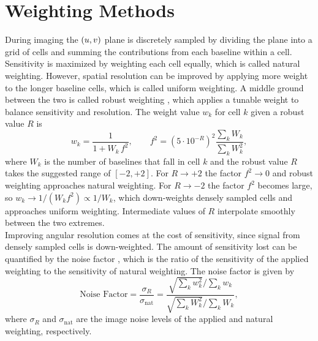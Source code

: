 \section{Weighting Methods}
During imaging the ${(u,v)}$ plane is discretely sampled by dividing the plane into a grid of cells and summing the contributions from each baseline within a cell. Sensitivity is maximized by weighting each cell equally, which is called natural weighting. However, spatial resolution can be improved by applying more weight to the longer baseline cells, which is called uniform weighting. A middle ground between the two is called robust weighting \cite{briggsHighFidelityDeconvolution1995}, which applies a tunable weight to balance sensitivity and resolution. The weight value $w_k$ for cell $k$ given a robust value $R$ is
\begin{equation}
    w_k = \frac{1}{1 + W_k\, f^2},
    \qquad
    f^2 = \left(5 \cdot 10^{-R}\right)^2 \frac{\sum_k W_k}{\sum_k W_k^2},
    \label{eq:briggs}
\end{equation}
where $W_k$ is the number of baselines that fall in cell $k$ and the robust value $R$ takes the suggested range of $[-2, +2]$. For $R \to +2$ the factor $f^2 \to 0$ and robust weighting approaches natural weighting. For $R \to -2$ the factor $f^2$ becomes large, so $w_k \to 1/(W_k f^2) \propto 1/W_k$, which down-weights densely sampled cells and approaches uniform weighting. Intermediate values of $R$ interpolate smoothly between the two extremes.\\

Improving angular resolution comes at the cost of sensitivity, since signal from densely sampled cells is down-weighted. The amount of sensitivity lost can be quantified by the noise factor \cite{briggsHighFidelityDeconvolution1995}, which is the ratio of the sensitivity of the applied weighting to the sensitivity of natural weighting. The noise factor is given by
\begin{equation}
    \text{Noise Factor} = \frac{\sigma_R}{\sigma_\text{nat}} = \frac{\sqrt{\sum_k w_k^2} \big/ \sum_k w_k}{\sqrt{\sum_k W_k^2} \big/ \sum_k W_k},
    \label{eq:noise_factor}
\end{equation}
where $\sigma_R$ and $\sigma_\text{nat}$ are the image noise levels of the applied and natural weighting, respectively.

